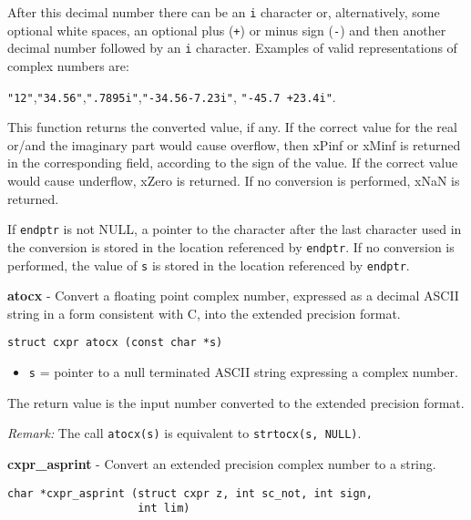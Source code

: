 \documentclass{article}
\begin{document}
After this decimal number there can be an \texttt{i} character or,
alternatively, some optional white spaces,
an optional plus (\texttt{+}) or minus sign (\texttt{-}) and 
then another decimal number followed by an \texttt{i} character.
Examples of valid representations of complex numbers are:

\texttt{"12"},\texttt{"34.56"},\texttt{".7895i"},\texttt{"-34.56-7.23i"},
\texttt{"-45.7   +23.4i"}.

This function returns the converted value, if any.
If  the  correct  value for the real or/and
the imaginary part  would  cause  overflow, then xPinf
or xMinf is returned in the corresponding field, 
according to the sign of the value.
If the correct value would cause underflow, xZero is returned.
If no conversion is performed, xNaN is returned.

If \texttt{endptr} is not NULL, a pointer to the character after the last character
used  in  the  conversion  is  stored in the location referenced by
\texttt{endptr}.
If no conversion is performed, the value of \texttt{s} is
stored in the location referenced by \texttt{endptr}.


\hrulefill{}

\textbf{atocx} - Convert a floating point complex number,
expressed as a decimal ASCII string
in a form consistent with C, into the extended precision format.

\begin{verbatim}
struct cxpr atocx (const char *s)
\end{verbatim}

\begin{itemize}
\item \texttt{s} = pointer to a null terminated ASCII string expressing a
complex number.
\end{itemize}

The return value is the input number converted to the
extended precision format.

\textit{Remark:}
The call  \texttt{atocx(s)}  is equivalent to \texttt{strtocx(s, NULL)}.


\hrulefill{}

\textbf{cxpr\_asprint} - Convert an extended precision complex 
number to a string.

\begin{verbatim}
char *cxpr_asprint (struct cxpr z, int sc_not, int sign,
                    int lim)
\end{verbatim}
\end{document}
